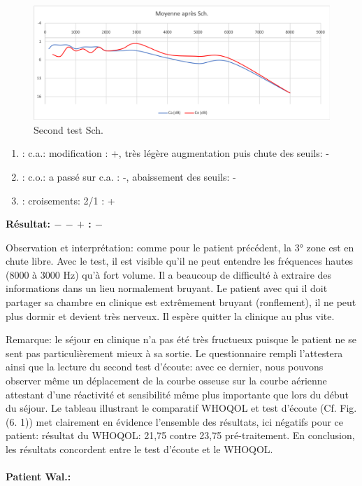          \begin{figure}[th]
\centering
\includegraphics[width=0.7\linewidth]{images/graphiques/schaff_post.png}
\caption[Patient Sch.: 2° test]{Second test Sch.}

\end{figure}


\begin{enumerate}
	
	\item : c.a.:  modification : +, très légère augmentation puis chute des
	seuils: -
	\item : c.o.: a passé sur c.a. : -, abaissement des seuils:  -
	\item : croisements: 2/1 :     +
\end{enumerate}
\textbf{ Résultat:  $-$    $-$   $+$         :   $-$ }


Observation et interprétation: comme pour le patient précédent, la 3° zone est en chute libre. Avec le 
test, il est visible qu'il ne peut entendre les fréquences hautes (8000 à 3000 Hz) qu'à fort volume.  Il a  
beaucoup de difficulté à extraire des informations dans un 
lieu normalement bruyant. Le patient avec qui il doit partager sa chambre en clinique est extrêmement 
bruyant 
(ronflement), il ne peut plus dormir et devient très nerveux. Il espère quitter la clinique au plus 
vite.


Remarque: le séjour en clinique n'a pas été très fructueux puisque le patient ne se sent pas 
particulièrement mieux à sa sortie. Le questionnaire rempli l'attestera ainsi que la lecture du second test 
d'écoute: avec ce dernier, nous pouvons observer même un déplacement de la courbe osseuse sur la 
courbe aérienne attestant d'une réactivité et sensibilité même plus importante que lors du début du 
séjour. Le tableau illustrant le  comparatif WHOQOL et test d'écoute (Cf. Fig. (6. 1))  met clairement en 
évidence 
l'ensemble des 
résultats, ici négatifs pour ce patient: résultat du WHOQOL: 21,75 contre 23,75 pré-traitement.
En conclusion, les résultats concordent entre le test d'écoute et le WHOQOL.

\paragraph{ Patient Wal.:}

